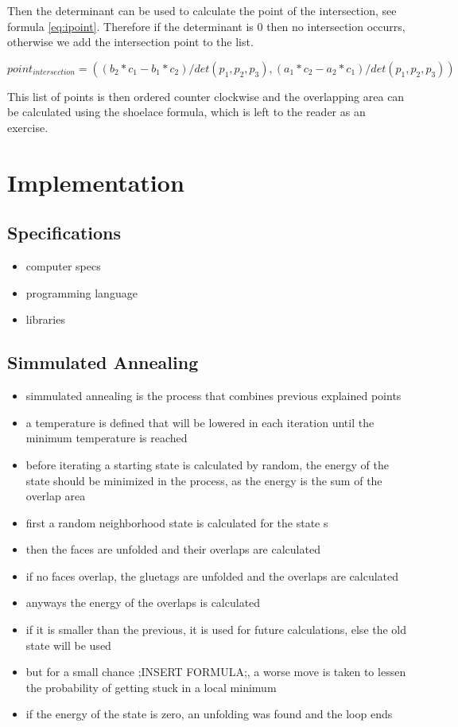 \documentclass[draft,final]{vutinfth} %
\begin{document}
Then the determinant can be used to calculate the point of the intersection, see formula \ref{eq:ipoint}. Therefore if the determinant is $0$ then no intersection occurrs, otherwise we add the intersection point to the list.

\begin{equation}
\label{eq:ipoint}
point_{intersection} = ((b_2*c_1 - b_1*c_2)/det(p_1, p_2, p_3),(a_1*c_2 - a_2*c_1)/det(p_1, p_2, p_3))
\end{equation}

This list of points is then ordered counter clockwise and the overlapping area can be calculated using the shoelace formula, which is left to the reader as an exercise.


\chapter{Implementation}
\label{chap:Implementation}

\section{Specifications}

\begin{itemize}
	\item computer specs
	\item programming language
	\item libraries
\end{itemize}

\section{Simmulated Annealing}

\begin{itemize}
	\item simmulated annealing is the process that combines previous explained points
	\item a temperature is defined that will be lowered in each iteration until the minimum temperature is reached
	\item before iterating a starting state is calculated by random, the energy of the state should be minimized in the process, as the energy is the sum of the overlap area
	\item first a random neighborhood state is calculated for the state s
	\item then the faces are unfolded and their overlaps are calculated
	\item if no faces overlap, the gluetags are unfolded and the overlaps are calculated
	\item anyways the energy of the overlaps is calculated	
	\item if it is smaller than the previous, it is used for future calculations, else the old state will be used
	\item but for a small chance ;INSERT FORMULA;, a worse move is taken to lessen the probability of getting stuck in a local minimum
	\item if the energy of the state is zero, an unfolding was found and the loop ends
\end{itemize}
\end{document}
